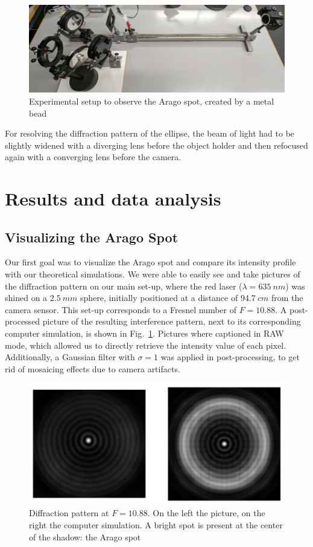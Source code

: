 \documentclass[11pt,a4paper]{article}
\begin{document}
\begin{figure}[h]
    \centering
    \includegraphics[width=0.7\linewidth]{images/Setup Arago Spot.jpeg}
    \caption{Experimental setup to observe the Arago spot, created by a metal bead}
\end{figure}

For resolving the diffraction pattern of the ellipse, the beam of light had to be slightly widened with a diverging lens before the object holder and then refocused again with a converging lens before the camera. 

\section{Results and data analysis}
\label{sec:results}

\subsection{Visualizing the Arago Spot}
Our first goal was to visualize the Arago spot and compare its intensity profile with our theoretical simulations. We were able to easily see and take pictures of the diffraction pattern on our main set-up, where the red laser (\(\lambda = \SI{635}{nm}\)) was shined on a \(\SI{2.5}{mm}\) sphere, initially positioned at a distance of \(\SI{94.7}{cm}\) from the camera sensor. This set-up corresponds to a Fresnel number of \(F = 10.88\). A post-processed picture of the resulting interference pattern, next to its corresponding computer simulation, is shown in Fig.~\ref{fig:Arago spot}. Pictures where captioned in RAW mode, which allowed us to directly retrieve the intensity value of each pixel. Additionally, a Gaussian filter with \(\sigma = 1\) was applied in post-processing, to get rid of mosaicing effects due to camera artifacts.

\begin{figure}[H]
    \centering
    \includegraphics[width=0.5\linewidth]{images/Arago-Spot.pdf}
    \caption{Diffraction pattern at \(F = 10.88\). On the left the picture, on the right the computer simulation. A bright spot is present at the center of the shadow: the Arago spot}
    \label{fig:Arago spot}
\end{figure}
\end{document}
